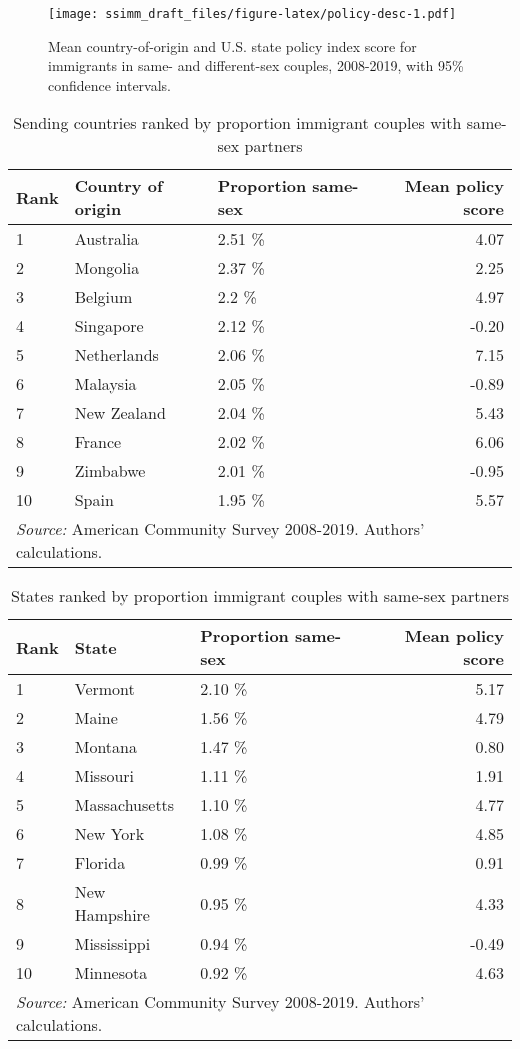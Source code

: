 \documentclass[
  11pt,
]{article}
\begin{document}
\begin{figure}
\centering
\texttt{[image: ssimm\_draft\_files/figure-latex/policy-desc-1.pdf]}
\caption{\label{fig:policy-desc}Mean country-of-origin and U.S. state policy index score for immigrants in same- and different-sex couples, 2008-2019, with 95\% confidence intervals.}
\end{figure}

\begin{table}

\caption{\label{tab:country-tab}Sending countries ranked by proportion immigrant couples with same-sex partners}
\centering
\begin{tabular}[t]{lllr}
\toprule
Rank & Country of origin & Proportion same-sex & Mean policy score\\
\midrule
1 & Australia & 2.51 \% & 4.07\\
2 & Mongolia & 2.37 \% & 2.25\\
3 & Belgium & 2.2 \% & 4.97\\
4 & Singapore & 2.12 \% & -0.20\\
5 & Netherlands & 2.06 \% & 7.15\\
6 & Malaysia & 2.05 \% & -0.89\\
7 & New Zealand & 2.04 \% & 5.43\\
8 & France & 2.02 \% & 6.06\\
9 & Zimbabwe & 2.01 \% & -0.95\\
10 & Spain & 1.95 \% & 5.57\\
\bottomrule
\multicolumn{4}{l}{\rule{0pt}{1em}\textit{Source:} American Community Survey 2008-2019. Authors' calculations.}\\
\end{tabular}
\end{table}

\begin{table}

\caption{\label{tab:state-tab}States ranked by proportion immigrant couples with same-sex partners}
\centering
\begin{tabular}[t]{lllr}
\toprule
Rank & State & Proportion same-sex & Mean policy score\\
\midrule
1 & Vermont & 2.10 \% & 5.17\\
2 & Maine & 1.56 \% & 4.79\\
3 & Montana & 1.47 \% & 0.80\\
4 & Missouri & 1.11 \% & 1.91\\
5 & Massachusetts & 1.10 \% & 4.77\\
6 & New York & 1.08 \% & 4.85\\
7 & Florida & 0.99 \% & 0.91\\
8 & New Hampshire & 0.95 \% & 4.33\\
9 & Mississippi & 0.94 \% & -0.49\\
10 & Minnesota & 0.92 \% & 4.63\\
\bottomrule
\multicolumn{4}{l}{\rule{0pt}{1em}\textit{Source:} American Community Survey 2008-2019. Authors' calculations.}\\
\end{tabular}
\end{table}
\end{document}
